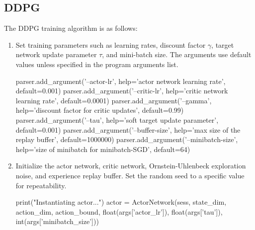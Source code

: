 \subsection{DDPG}
The DDPG training algorithm is as follows:
\begin{enumerate}
\item Set training parameters such as learning rates, discount factor $\gamma$, target network update parameter $\tau$, and mini-batch size. The arguments use default values unless specified in the program arguments list.
\begin{python}[caption={Training Parameter Initialization},label={list:train_param_init},xleftmargin=\dimexpr-\csname @totalleftmargin\endcsname]
parser.add_argument('--actor-lr', help='actor network learning rate', default=0.001) 
parser.add_argument('--critic-lr', help='critic network learning rate', default=0.0001) 
parser.add_argument('--gamma', help='discount factor for critic updates', default=0.99) 
parser.add_argument('--tau', help='soft target update parameter', default=0.001) 
parser.add_argument('--buffer-size', help='max size of the replay buffer', default=1000000)
parser.add_argument('--minibatch-size', help='size of minibatch for minibatch-SGD', default=64)
\end{python}
\item Initialize the actor network, critic network, Ornstein-Uhlenbeck exploration noise, and experience replay buffer. Set the random seed to a specific value for repeatability.
\begin{python}[caption={Network, Noise, and Experience Replay Buffer Initialization},label={list:net_init},xleftmargin=\dimexpr-\csname @totalleftmargin\endcsname]
print("Instantiating actor...")
actor = ActorNetwork(sess, state_dim, action_dim, action_bound,
                     float(args['actor_lr']), float(args['tau']),
                     int(args['minibatch_size']))


\end{python}
\end{enumerate}
